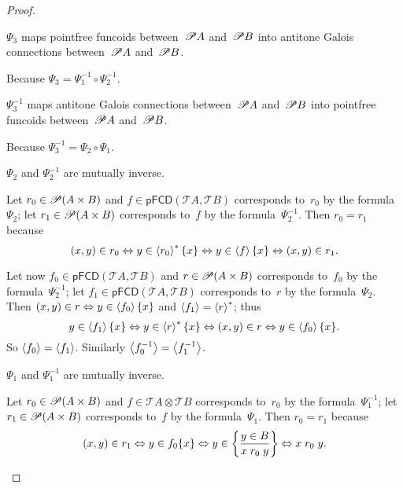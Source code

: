 \begin{proof}
\begin{claim}
$\Psi_3$ maps pointfree funcoids between~$\mathscr{P} A$ and~$\mathscr{P} B$ into antitone Galois connections between~$\mathscr{P} A$ and~$\mathscr{P} B$.
\end{claim}
\begin{claimproof}
Because $\Psi_3 = \Psi_1^{-1}\circ\Psi_2^{-1}$.
\end{claimproof}

\begin{claim}
$\Psi_3^{-1}$ maps antitone Galois connections between~$\mathscr{P} A$ and~$\mathscr{P} B$ into pointfree funcoids between~$\mathscr{P} A$ and~$\mathscr{P} B$.
\end{claim}
\begin{claimproof}
Because $\Psi_3^{-1} = \Psi_2\circ\Psi_1$.
\end{claimproof}

\begin{claim}
$\Psi_2$ and $\Psi_2^{-1}$ are mutually inverse.
\end{claim}
\begin{claimproof}
Let $r_{0}\in\mathscr{P}(A\times B)$ and $f\in\mathsf{pFCD}(\mathscr{T}A,\mathscr{T}B)$
corresponds to~$r_{0}$ by the formula~$\Psi_2$; let $r_{1}\in\mathscr{P}(A\times B)$
corresponds to~$f$ by the formula~$\Psi_2^{-1}$. Then $r_{0}=r_{1}$
because 
\[
(x,y)\in r_{0}\Leftrightarrow y\in\left\langle r_{0}\right\rangle ^{\ast}\{x\}\Leftrightarrow y\in\left\langle f\right\rangle\{x\}\Leftrightarrow(x,y)\in r_{1}.
\]

Let now $f_{0}\in\mathsf{pFCD}(\mathscr{T}A,\mathscr{T}B)$ and $r\in\mathscr{P}(A\times B)$
corresponds to~$f_{0}$ by the formula~$\Psi_2^{-1}$; let $f_{1}\in\mathsf{pFCD}(\mathscr{T}A,\mathscr{T}B)$
corresponds to~$r$ by the formula~$\Psi_2$. Then $(x,y)\in r\Leftrightarrow y\in\left\langle f_{0}\right\rangle\{x\}$
and $\left\langle f_{1}\right\rangle=\left\langle r\right\rangle ^{\ast}$; thus 
\[
y\in\left\langle f_{1}\right\rangle\{x\}\Leftrightarrow y\in\left\langle r\right\rangle ^{\ast}\{x\}\Leftrightarrow(x,y)\in r\Leftrightarrow y\in\left\langle f_{0}\right\rangle\{x\}.
\]
So $\left\langle f_{0}\right\rangle=\left\langle f_{1}\right\rangle$. Similarly $\left\langle f_{0}^{-1}\right\rangle=\left\langle f_{1}^{-1}\right\rangle$.
\end{claimproof}

\begin{claim}
$\Psi_1$ and $\Psi_1^{-1}$ are mutually inverse.
\end{claim}
\begin{claimproof}
Let $r_0\in\mathscr{P}(A\times B)$ and $f\in\mathscr{T}A\otimes\mathscr{T}B$
corresponds to~$r_{0}$ by the formula~$\Psi_1^{-1}$; let $r_{1}\in\mathscr{P}(A\times B)$
corresponds to~$f$ by the formula~$\Psi_1$. Then $r_{0}=r_{1}$ because
\[
(x,y)\in r_1 \Leftrightarrow y\in f_0\{x\} \Leftrightarrow y\in\left\{ \frac{y\in B}{x\mathrel{r_0}y}\right\} \Leftrightarrow x\mathrel{r_0}y.
\]


\end{claimproof}
\end{proof}
